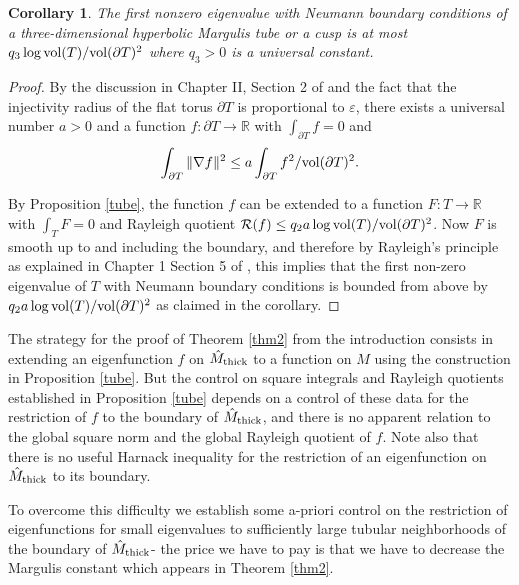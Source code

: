 \documentclass[11pt]{amsart}
\theoremstyle{plain}
\theoremstyle{plain}
\newtheorem{corollary}[theorem]{Corollary}
\theoremstyle{definition}
\newtheorem{remark}[theorem]{Remark}
\renewcommand{\epsilon}{\varepsilon}
\newcommand{\cal}{\mathcal}
\begin{document}
\begin{corollary}\label{neumanntube}
The first nonzero eigenvalue with Neumann boundary conditions
of a three-dimensional hyperbolic Margulis tube or a cusp is at most
$q_3\log{\rm vol}(T)/{\rm vol}(\partial T)^2$
where $q_3>0$ is a universal constant. 
\end{corollary}
\begin{proof}
By the discussion in 
Chapter II, Section 2 of \cite{C84} 
and the fact that the injectivity radius of the flat torus
$\partial T$ is proportional to $\epsilon$,  
there exists a universal number $a>0$ and 
a function $f:\partial T\to \mathbb{R}$ with $\int_{\partial T}f=0$ and 
\[\int_{\partial T}\Vert \nabla f\Vert^2\leq a\int_{\partial T}f^2 /{\rm vol}(\partial T)^2.\]

By Proposition \ref{tube}, the function $f$ can be extended to a function
$F:T\to \mathbb{R}$ with $\int_T F=0$ and Rayleigh quotient
${\cal R}(f)\leq q_2a\log {\rm vol}(T)/{\rm vol}(\partial T)^2$. 
Now $F$ is smooth up to and including the boundary, and therefore 
by Rayleigh's principle as 
explained in Chapter 1 Section 5 of \cite{C84},
this implies 
that the first non-zero eigenvalue of $T$ with Neumann boundary conditions 
is bounded from above by $q_2a\log{\rm vol}(T)/{\rm vol}(\partial T)^2$ as
claimed in the corollary. 
\end{proof}



The strategy for the proof of 
Theorem \ref{thm2} from the introduction consists in extending
an eigenfunction $f$ on $\hat M_{\rm thick}$ to a function on $M$
using the construction in Proposition \ref{tube}. But the
control on square integrals and Rayleigh quotients
established in Proposition \ref{tube} depends on a control of
these data for the restriction of $f$ to the boundary of
$\hat M_{\rm thick}$, and there is no apparent relation to the
global square norm and the global Rayleigh quotient of $f$.
Note also that there is no useful Harnack inequality for the restriction of 
an eigenfunction on $\hat M_{\rm thick}$ to its boundary. 

To overcome this difficulty we establish some a-priori control
on the restriction of eigenfunctions for small eigenvalues to sufficiently large
tubular neighborhoods of the boundary of $\hat M_{\rm thick}$- the price
we have to pay is that we have to decrease the Margulis constant
which appears in Theorem \ref{thm2}. 
\end{document}
